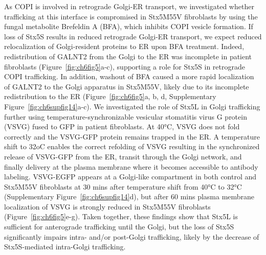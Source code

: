 As COPI is involved in retrograde Golgi-ER transport\cite{glick_membrane_2009}, we investigated whether trafficking at this interface is compromised in Stx5M55V fibroblasts by using the fungal metabolite Brefeldin A (BFA), which inhibits COPI vesicle formation\cite{galea_high-content_2015}. If loss of Stx5S results in reduced retrograde Golgi-ER transport, we expect reduced relocalization of Golgi-resident proteins to ER upon BFA treatment. Indeed, redistribution of GALNT2 from the Golgi to the ER was incomplete in patient fibroblasts (Figure~\ref{fig:ch6fig5}a-c), supporting a role for Stx5S in retrograde COPI trafficking. In addition, washout of BFA caused a more rapid localization of GALNT2 to the Golgi apparatus in Stx5M55V, likely due to its incomplete redistribution to the ER (Figure~\ref{fig:ch6fig5}a, b, d, Supplementary Figure~\ref{fig:ch6supfig14}a-c). We investigated the role of Stx5L in Golgi trafficking further using temperature-synchronizable vesicular stomatitis virus G protein (VSVG) fused to GFP\cite{lippincott-schwartz_secretory_2000} in patient fibroblasts. At 40°C, VSVG does not fold correctly and the VSVG-GFP protein remains trapped in the ER. A temperature shift to 32oC enables the correct refolding of VSVG resulting in the synchronized release of VSVG-GFP from the ER, transit through the Golgi network, and finally delivery at the plasma membrane where it becomes accessible to antibody labeling. VSVG-EGFP appears at a Golgi-like compartment in both control and Stx5M55V fibroblasts at 30 mins after temperature shift from 40°C to 32°C (Supplementary Figure~\ref{fig:ch6supfig14}d), but after 60 mins plasma membrane localization of VSVG is strongly reduced in Stx5M55V fibroblasts (Figure~\ref{fig:ch6fig5}e-g). Taken together, these findings show that Stx5L is sufficient for anterograde trafficking until the Golgi, but the loss of Stx5S significantly impairs intra- and/or post-Golgi trafficking, likely by the decrease of Stx5S-mediated intra-Golgi trafficking. 

